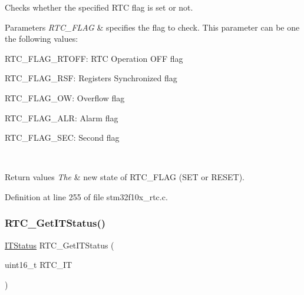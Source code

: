 Checks whether the specified R\+TC flag is set or not. 


\begin{DoxyParams}{Parameters}
{\em R\+T\+C\+\_\+\+F\+L\+AG} & specifies the flag to check. This parameter can be one the following values\+: \begin{DoxyItemize}
\item R\+T\+C\+\_\+\+F\+L\+A\+G\+\_\+\+R\+T\+O\+FF\+: R\+TC Operation O\+FF flag \item R\+T\+C\+\_\+\+F\+L\+A\+G\+\_\+\+R\+SF\+: Registers Synchronized flag \item R\+T\+C\+\_\+\+F\+L\+A\+G\+\_\+\+OW\+: Overflow flag \item R\+T\+C\+\_\+\+F\+L\+A\+G\+\_\+\+A\+LR\+: Alarm flag \item R\+T\+C\+\_\+\+F\+L\+A\+G\+\_\+\+S\+EC\+: Second flag \end{DoxyItemize}
\\
\hline
\end{DoxyParams}

\begin{DoxyRetVals}{Return values}
{\em The} & new state of R\+T\+C\+\_\+\+F\+L\+AG (S\+ET or R\+E\+S\+ET). \\
\hline
\end{DoxyRetVals}


Definition at line 255 of file stm32f10x\+\_\+rtc.\+c.

\mbox{\label{group___r_t_c___private___functions_ga23274ad8aa28e86d5b0d58eee295db21}} 
\subsubsection{\texorpdfstring{R\+T\+C\+\_\+\+Get\+I\+T\+Status()}{RTC\_GetITStatus()}}
{\footnotesize\ttfamily \hyperlink{group___exported__types_gaacbd7ed539db0aacd973a0f6eca34074}{I\+T\+Status} R\+T\+C\+\_\+\+Get\+I\+T\+Status (\begin{DoxyParamCaption}\item[{uint16\+\_\+t}]{R\+T\+C\+\_\+\+IT }\end{DoxyParamCaption})}



